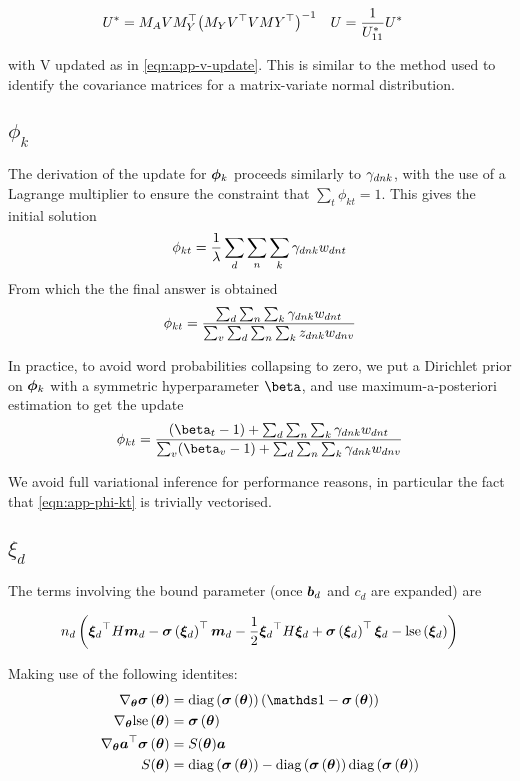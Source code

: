 \begin{align}
U^* &= M_A V M_Y^\top {\left( M_Y V ^\top V MY ^\top \right)}^{-1} &
U &= \frac{1}{U^*_{11}} U^*
\end{align}

with V updated as in \eqref{eqn:app-v-update}. This is similar to the  method used to  identify the covariance matrices for a matrix-variate normal distribution.


\subsection{$\phi_k$}
The derivation of the update for ${ \bm \phi_k }$ proceeds similarly to ${ \gamma_{dnk} }$, with the use of a Lagrange multiplier to ensure the constraint that $\sum_t \phi_{kt} = 1$. This gives the initial solution
\begin{align}
\phi_{kt} = \frac{1}{ {\lambda} } \sum_d \sum_n \sum_k { \gamma_{dnk} } { w_{dnt} }
\end{align}
From which the the final answer is obtained
\begin{align}
\phi_{kt} = \frac{\sum_d \sum_n \sum_k { \gamma_{dnk} } { w_{dnt} }}{\sum_v \sum_d \sum_n \sum_k { z_{dnk} } w_{dnv}}
\end{align}

In practice, to avoid word probabilities collapsing to zero, we put a Dirichlet prior on ${ \bm \phi_k }$ with a symmetric hyperparameter $\vv{\beta}$, and use maximum-a-posteriori estimation to get the update
\begin{align}
\phi_{kt} = \frac{(\beta_t - 1) + \sum_d \sum_n \sum_k \gdnk \wdnt}{\sum_v (\beta_v - 1) + \sum_d \sum_n \sum_k \gdnk w_{dnv}} \label{eqn:app-phi-kt}
\end{align}

We avoid full variational inference for performance reasons, in particular the fact that \eqref{eqn:app-phi-kt} is trivially vectorised.

\subsection{$\xi_d$}
The terms involving the bound parameter (once $\bm b_d$ and $c_d$ are expanded) are

\begin{align}
n_d \left( 
    { \bm \xi_d }^\top H \bm m_d
    - \bm \sigma\left({ \bm \xi_d }\right)^\top \bm m_d 
        - \frac{1}{2}{ \bm \xi_d }^\top H { \bm \xi_d } 
        + \bm \sigma\left({ \bm \xi_d }\right)^\top {  \bm \xi _d } 
        - \text{lse}\left({ \bm \xi_d }\right)
\right)
\end{align}

Making use of the following identites:
\begin{align}
\nabla_{\vv{\theta}}\vv{\sigma}\left(\vv{\theta}\right) & = \diag{\vv{\sigma}\left(\vv{\theta}\right) } \left(\one - \vv{\sigma}\left(\vv{\theta}\right) \right) \\
\nabla_{\vv{\theta}}\lse\left(\vv{\theta}\right) & = \vv{\sigma}\left(\vv{\theta}\right)  \\
\nabla_{\vv{\theta}} \vv{a}\T\vv{\sigma}\left(\vv{\theta}\right) & = S(\vv{\theta}) \vv{a}\\
S(\vv{\theta)} & = \diag{\vv{\sigma}\left(\vv{\theta}\right) } - \diag{\vv{\sigma}\left(\vv{\theta}\right) }\diag{\vv{\sigma}\left(\vv{\theta}\right) }
\end{align}

